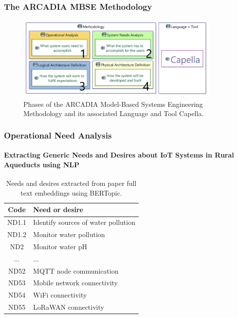 \documentclass[aspectratio=169]{beamer}
\begin{document}
\begin{frame}
    \frametitle{The ARCADIA MBSE Methodology}

    \begin{figure}
        \centering
        \includegraphics[width=0.9\textwidth]{images/phases_arcadia.png}
        \caption{Phases of the ARCADIA Model-Based Systems Engineering Methodology and its associated Language and Tool Capella.}
    \end{figure}
\end{frame}

\begin{frame}
    \frametitle{\small Operational Need Analysis}
    \framesubtitle{Extracting Generic Needs and Desires about IoT Systems in Rural Aqueducts using NLP}

    \begin{table}
        \centering
        \caption{Needs and desires extracted from paper full text embeddings using BERTopic.}
        \begin{tabular}{c p{6cm}}
            Code & Need or desire \\
            \hline
            ND1.1 & Identify sources of water pollution \\ %
            ND1.2 & Monitor water pollution \\ %
            ND2 & Monitor water pH \\ %
            ... & ... \\ %
            ND52 & MQTT node communication \\
            ND53 & Mobile network connectivity \\
            ND54 & WiFi connectivity \\
            ND55 & LoRaWAN connectivity \\
            \hline
        \end{tabular}
        \label{tab:clusters}
    \end{table}
\end{frame}
\end{document}
